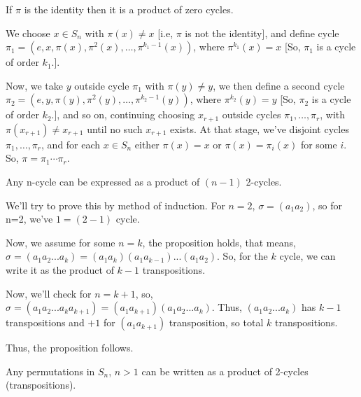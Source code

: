 \begin{proofcustom}
    If $\pi$ is the identity then it is a product of zero cycles.

We choose $x \in S_n$ with $\pi\left(x\right) \neq x$ [i.e, $\pi$ is not the identity], and define cycle $\pi_{1}=\left(e, x, \pi\left(x\right), \pi^{2}\left(x\right), \ldots, \pi^{k_{1}-1}\left(x\right)\right)$, where $\pi^{k_{1}}\left(x\right)=x$ [So, $\pi_1$ is a cycle of order $k_1$.].

Now, we take $y$ outside cycle $\pi_{1}$ with $\pi\left(y\right) \neq y$, we then define a second cycle $\pi_{2}=\left(e, y, \pi\left(y\right), \pi^{2}\left(y\right), \ldots, \pi^{k_{2}-1}\left(y\right)\right)$, where $\pi^{k_{2}}\left(y\right)=y$ [So, $\pi_2$ is a cycle of order $k_2$.], and so on, continuing choosing $x_{r+1}$ outside cycles $\pi_{1}, \ldots, \pi_{r}$, with $\pi\left(x_{r+1}\right) \neq x_{r+1}$ until no such $x_{r+1}$ exists. At that stage, we've disjoint cycles $\pi_{1}, \ldots, \pi_{r}$, and for each $x \in S_n$ either $\pi(x)=x$ or $\pi(x)=\pi_{i}(x)$ for some $i$. So, $\pi=\pi_{1} \cdots \pi_{r}$.
\end{proofcustom}

\begin{proposition}
    Any n-cycle can be expressed as a product of $(n - 1)$ 2-cycles.
\end{proposition}

\begin{proofcustom}
    We'll try to prove this by method of induction. 
    For $n=2$, $\sigma= (a_1a_2)$, so for n=2, we've $ 1= (2-1)$ cycle.

    Now, we assume for some $n=k$, the proposition holds, that means, 
    $\sigma=(a_1a_2...a_k)=(a_1a_k)(a_1a_{k-1})...(a_1a_2)$. So, for the $k$ cycle, we can write it as the product of  $k-1$ transpositions. 

    Now, we'll check for $n=k+1$, so, $\sigma=(a_1a_2...a_ka_{k+1})= (a_1a_{k+1})(a_1a_2...a_k)$. Thus, $(a_1a_2...a_k)$ has $k-1$ transpositions and $+1$ for $(a_1a_{k+1})$ transposition, so total $k$ transpositions.

    Thus, the proposition follows. 


\end{proofcustom}
\newpage
\begin{proposition}
    Any permutations in $S_n$, $n>1$ can be written as a product of 2-cycles (transpositions).
\end{proposition}

